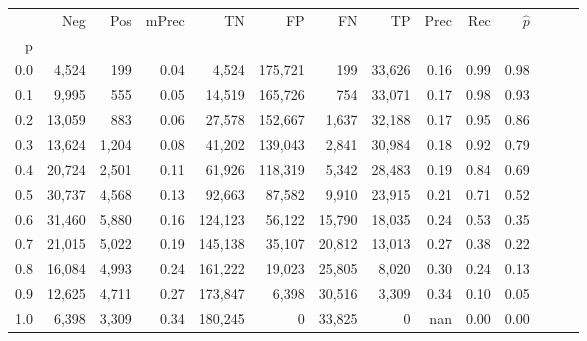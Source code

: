 \begin{tabular}{rrrrrrrrrrrrrr}
\toprule
{} &     Neg &    Pos & mPrec &       TN &       FP &      FN &      TP &  Prec &   Rec & $\hat{p}$ \\
p   &         &        &       &          &          &         &         &       &       &           \\
\midrule
0.0 &   4,524 &    199 &  0.04 &    4,524 &  175,721 &     199 &  33,626 &  0.16 &  0.99 &      0.98 \\
0.1 &   9,995 &    555 &  0.05 &   14,519 &  165,726 &     754 &  33,071 &  0.17 &  0.98 &      0.93 \\
0.2 &  13,059 &    883 &  0.06 &   27,578 &  152,667 &   1,637 &  32,188 &  0.17 &  0.95 &      0.86 \\
0.3 &  13,624 &  1,204 &  0.08 &   41,202 &  139,043 &   2,841 &  30,984 &  0.18 &  0.92 &      0.79 \\
0.4 &  20,724 &  2,501 &  0.11 &   61,926 &  118,319 &   5,342 &  28,483 &  0.19 &  0.84 &      0.69 \\
0.5 &  30,737 &  4,568 &  0.13 &   92,663 &   87,582 &   9,910 &  23,915 &  0.21 &  0.71 &      0.52 \\
0.6 &  31,460 &  5,880 &  0.16 &  124,123 &   56,122 &  15,790 &  18,035 &  0.24 &  0.53 &      0.35 \\
0.7 &  21,015 &  5,022 &  0.19 &  145,138 &   35,107 &  20,812 &  13,013 &  0.27 &  0.38 &      0.22 \\
0.8 &  16,084 &  4,993 &  0.24 &  161,222 &   19,023 &  25,805 &   8,020 &  0.30 &  0.24 &      0.13 \\
0.9 &  12,625 &  4,711 &  0.27 &  173,847 &    6,398 &  30,516 &   3,309 &  0.34 &  0.10 &      0.05 \\
1.0 &   6,398 &  3,309 &  0.34 &  180,245 &        0 &  33,825 &       0 &   nan &  0.00 &      0.00 \\
\bottomrule
\end{tabular}
